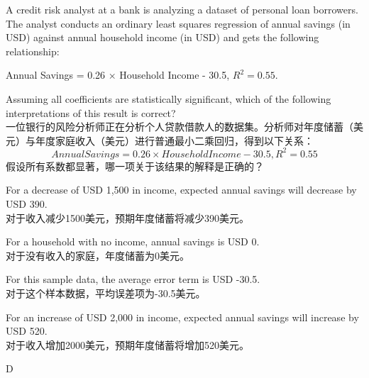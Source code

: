 \documentclass{article}
\newcounter{question} %
\begin{document}
\begin{question}
    A credit risk analyst at a bank is analyzing a dataset of personal loan borrowers. The analyst conducts an ordinary least squares regression of annual savings (in USD) against annual household income (in USD) and gets the following relationship: 
    
    Annual Savings = 0.26 × Household Income - 30.5, \(R^{2}=0.55\). 
    
    Assuming all coefficients are statistically significant, which of the following interpretations of this result is correct?\\
    一位银行的风险分析师正在分析个人贷款借款人的数据集。分析师对年度储蓄（美元）与年度家庭收入（美元）进行普通最小二乘回归，得到以下关系：
    \[Annual Savings = 0.26 \times Household Income - 30.5, R^{2}=0.55\]
    假设所有系数都显著，哪一项关于该结果的解释是正确的？
    \end{question}
    
    \begin{choices}
        \item For a decrease of USD 1,500 in income, expected annual savings will decrease by USD 390.\\
        对于收入减少1500美元，预期年度储蓄将减少390美元。
        \item For a household with no income, annual savings is USD 0.\\
        对于没有收入的家庭，年度储蓄为0美元。
        \item For this sample data, the average error term is USD -30.5.\\
        对于这个样本数据，平均误差项为-30.5美元。
        \item For an increase of USD 2,000 in income, expected annual savings will increase by USD 520.\\
        对于收入增加2000美元，预期年度储蓄将增加520美元。
    \end{choices}
    
    \begin{correctanswer}
        D
    \end{correctanswer}
    
\end{document}
